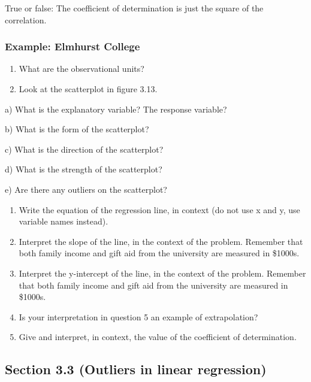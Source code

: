 \documentclass[
]{report}
\newcommand{\rgs}{\vspace{12pt}} %
\newcommand{\rgi}{\hspace{24pt}}  %
\begin{document}
True or false: The coefficient of determination is just the square of the correlation.

\hypertarget{example-elmhurst-college}{%
\subsubsection*{Example: Elmhurst College}\label{example-elmhurst-college}}

\begin{enumerate}
\def\labelenumi{\arabic{enumi}.}
\item
  What are the observational units?\\
  \rgs
\item
  Look at the scatterplot in figure 3.13.
\end{enumerate}

\rgi a) What is the explanatory variable? The response variable?\\
\rgs

\rgi b) What is the form of the scatterplot?\\
\rgs

\rgi c) What is the direction of the scatterplot?
\rgs

\rgi d) What is the strength of the scatterplot?
\rgs

\rgi e) Are there any outliers on the scatterplot?\\
\rgs

\begin{enumerate}
\def\labelenumi{\arabic{enumi}.}
\setcounter{enumi}{2}
\item
  Write the equation of the regression line, in context (do not use x and y, use variable names instead).
  \rgs
\item
  Interpret the slope of the line, in the context of the problem. Remember that both family income and gift aid from the university are measured in \$1000s.
  \rgs
\item
  Interpret the y-intercept of the line, in the context of the problem. Remember that both family income and gift aid from the university are measured in \$1000s.
  \rgs
\item
  Is your interpretation in question 5 an example of extrapolation?
  \rgs
\item
  Give and interpret, in context, the value of the coefficient of determination.
  \rgs
\end{enumerate}

\hypertarget{section-3.3-outliers-in-linear-regression}{%
\subsection*{Section 3.3 (Outliers in linear regression)}\label{section-3.3-outliers-in-linear-regression}}
\end{document}
